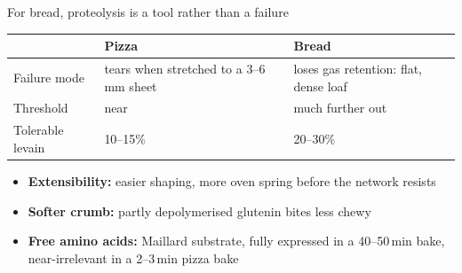 \documentclass[aspectratio=169,11pt]{beamer}
\newcommand{\tablefont}{\footnotesize\renewcommand{\arraystretch}{1.15}}
\begin{document}
\begin{frame}{For bread, proteolysis is a tool rather than a failure}
  \begingroup\tablefont
  \begin{tabularx}{\linewidth}{@{}l Y Y@{}}
    \toprule
    & \textbf{Pizza} & \textbf{Bread} \\
    \midrule
    Failure mode & tears when stretched to a 3--6\,mm sheet & loses gas
      retention: flat, dense loaf \\
    Threshold & near & much further out \\
    Tolerable levain & 10--15\% & 20--30\% \\
    \bottomrule
  \end{tabularx}\endgroup
  \smallskip
  \small
  \begin{itemize}\setlength{\itemsep}{0.1em}
    \item \textbf{Extensibility:} easier shaping, more oven spring before
      the network resists
    \item \textbf{Softer crumb:} partly depolymerised glutenin bites less
      chewy
    \item \textbf{Free amino acids:} Maillard substrate, fully expressed in
      a 40--50\,min bake, near-irrelevant in a 2--3\,min pizza bake
  \end{itemize}
\end{frame}
\end{document}
